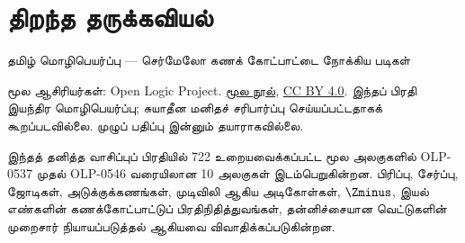 \documentclass[11pt,a4paper,openany]{memoir}
\begin{document}
\raggedright
\pagestyle{plain}
\chapter*{திறந்த தருக்கவியல்}
\noindent தமிழ் மொழிபெயர்ப்பு — செர்மேலோ கணக் கோட்பாட்டை நோக்கிய படிகள்

\noindent மூல ஆசிரியர்கள்: Open Logic Project.
\href{https://github.com/OpenLogicProject/OpenLogic}{மூல நூல்},
\href{https://creativecommons.org/licenses/by/4.0/}{CC BY 4.0}.
இந்தப் பிரதி இயந்திர மொழிபெயர்ப்பு; சுயாதீன மனிதச் சரிபார்ப்பு செய்யப்பட்டதாகக்
கூறப்படவில்லை. முழுப் பதிப்பு இன்னும் தயாராகவில்லை.

\noindent இந்தத் தனித்த வாசிப்புப் பிரதியில் 722 உறையவைக்கப்பட்ட மூல
அலகுகளில் OLP-0537 முதல் OLP-0546 வரையிலான 10 அலகுகள் இடம்பெறுகின்றன.
பிரிப்பு, சேர்ப்பு, ஜோடிகள், அடுக்குக்கணங்கள், முடிவிலி ஆகிய அடிகோள்கள்,
$\Zminus$, இயல் எண்களின் கணக்கோட்பாட்டுப் பிரதிநிதித்துவங்கள், தன்னிச்சையான
வெட்டுகளின் முறைசார் நியாயப்படுத்தல் ஆகியவை விவாதிக்கப்படுகின்றன.

\clearpage
\tableofcontents*



\end{document}
